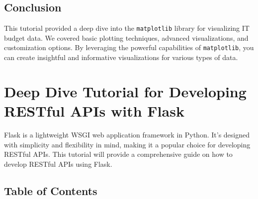 \documentclass[
  letterpaper,
  DIV=11,
  numbers=noendperiod]{scrreprt}
\newenvironment{Shaded}{\begin{snugshade}}{\end{snugshade}}
\newcommand{\DecValTok}[1]{\textcolor[rgb]{0.68,0.00,0.00}{#1}}
\newcommand{\NormalTok}[1]{\textcolor[rgb]{0.00,0.23,0.31}{#1}}
\newcommand{\OperatorTok}[1]{\textcolor[rgb]{0.37,0.37,0.37}{#1}}
\newcommand{\StringTok}[1]{\textcolor[rgb]{0.13,0.47,0.30}{#1}}
\begin{document}
\begin{Shaded}
\end{Shaded}

\section{Conclusion}\label{conclusion-42}

This tutorial provided a deep dive into the \texttt{matplotlib} library
for visualizing IT budget data. We covered basic plotting techniques,
advanced visualizations, and customization options. By leveraging the
powerful capabilities of \texttt{matplotlib}, you can create insightful
and informative visualizations for various types of data.


\chapter{Deep Dive Tutorial for Developing RESTful APIs with
Flask}\label{deep-dive-tutorial-for-developing-restful-apis-with-flask}

Flask is a lightweight WSGI web application framework in Python. It's
designed with simplicity and flexibility in mind, making it a popular
choice for developing RESTful APIs. This tutorial will provide a
comprehensive guide on how to develop RESTful APIs using Flask.

\section{Table of Contents}\label{table-of-contents-25}
\end{document}
